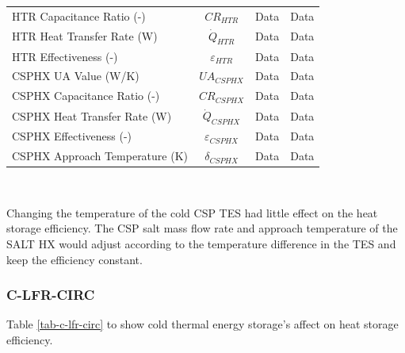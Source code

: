 \begin{paracol}{2}
\begin{specialtable}[htbp]
\begin{tabular}{lccc}
    HTR Capacitance Ratio (-)	&	$CR_{HTR}$	&	Data	&	Data	\\
    HTR Heat Transfer Rate (W)	&	$\dot{Q}_{HTR}$	&	Data	&	Data	\\
    HTR Effectiveness (-)	&	$\varepsilon_{HTR}$	&	Data	&	Data	\\
    CSPHX UA Value (W/K)	&	$UA_{CSPHX}$	&	Data	&	Data	\\
    CSPHX Capacitance Ratio (-)	&	$CR_{CSPHX}$	&	Data	&	Data	\\
    CSPHX Heat Transfer Rate (W)	&	$\dot{Q}_{CSPHX}$	&	Data	&	Data	\\
    CSPHX Effectiveness (-)	&	$\varepsilon_{CSPHX}$	&	Data	&	Data	\\
    CSPHX Approach Temperature (K)	&	$\delta_{CSPHX}$	&	Data	&	Data	\\
    
    \bottomrule
    \end{tabular}\\
\end{specialtable}

Changing the temperature of the cold CSP TES had little effect on the heat storage efficiency. The CSP salt mass flow rate and approach temperature of the SALT HX would adjust according to the temperature difference in the TES and keep the efficiency constant.

\subsubsection{C-LFR-CIRC}

Table \ref{tab-c-lfr-circ} to show cold thermal energy storage's affect on heat storage efficiency.


\end{paracol}

